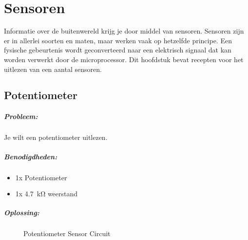 \chapter{Sensoren}
Informatie over de buitenwereld krijg je door middel van sensoren. Sensoren zijn er in allerlei soorten en maten, maar werken vaak op hetzelfde principe. Een fysische gebeurtenis wordt geconverteerd naar een elektrisch signaal dat kan worden verwerkt door de microprocessor. Dit hoofdstuk bevat recepten voor het uitlezen van een aantal sensoren.

\newpage
\section{Potentiometer}
\paragraph{Probleem:} Je wilt een potentiometer uitlezen.
\paragraph{Benodigdheden:}
\begin{itemize}
	\item 1x Potentiometer
	\item 1x \SI{4.7}{\kilo\ohm} weerstand
\end{itemize}
\paragraph{Oplossing:}
\begin{figure}[H]
	\caption{Potentiometer Sensor Circuit}
	\label{fig:PotSensor}
\end{figure}

